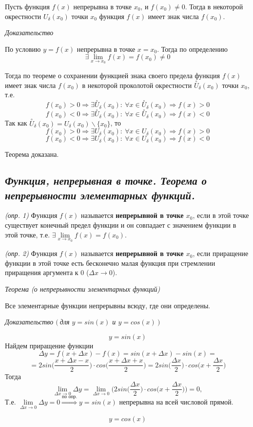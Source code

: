 Пусть функция $f(x)$ непрерывна в точке $x_0$, и $f(x_0) \neq 0$. Тогда в некоторой окрестности $U_\delta(x_0)$ точки $x_0$ функция $f(x)$ имеет знак числа $f(x_0)$.

\textit{Доказательство}

По условию $y = f(x)$ непрерывна в точке $x = x_0$. Тогда по определению $$\exists\lim\limits_{x \to x_0}f(x) = f(x_0) \neq 0$$

Тогда по теореме о сохранении функцией знака своего предела функция $f(x)$ имеет знак числа $f(x_0)$ в некоторой проколотой окрестности $\overset{\circ}U_\delta(x_0)$ точки $x_0$, т.е. $$f(x_0) > 0 \Rightarrow \exists \overset{\circ}U_\delta(x_0):\ \forall x \in \overset{\circ}U_\delta(x_0)\Rightarrow f(x) > 0 $$ $$f(x_0) < 0 \Rightarrow \exists \overset{\circ}U_\delta(x_0):\ \forall x \in \overset{\circ}U_\delta(x_0)\Rightarrow f(x) < 0 $$ Так как $\overset{\circ}U_\delta(x_0) = U_\delta(x_0) \backslash \{x_0\}$, то
$$f(x_0) > 0 \Rightarrow \exists U_\delta(x_0):\ \forall x \in U_\delta(x_0)\Rightarrow f(x) > 0 $$ $$f(x_0) < 0 \Rightarrow \exists U_\delta(x_0):\ \forall x \in U_\delta(x_0)\Rightarrow f(x) < 0 $$

Теорема доказана.
\newpage 
\subsection{\textit{Функция, непрерывная в точке. Теорема о непрерывности элементарных функций.}}

\textit{(опр. 1)} Функция $f(x)$ называется \textbf{непрерывной в точке $x_0$}, если в этой точке существует конечный предел функции и он совпадает с значением функции в этой точке, т.е. $\exists \lim\limits_{x \to x_0}f(x) = f(x_0)$.

\textit{(опр. 2)} Функция $f(x)$ называется \textbf{непрерывной в точке $x_0$}, если приращение функции в этой точке есть бесконечно малая функция при стремлении приращения аргумента к 0 ($\Delta x \rightarrow 0$).

\textit{Теорема (о непрерывности элементарных функций)}

Все элементарные функции непрерывны всюду, где они определены.

\textit{Доказательство $(\ $для $y = sin(x)$ и $y = cos( x)\ )$}
\begin{mainQuote}

$$y = sin(x)$$ Найдем приращение функции $$\Delta y = f(x + \Delta x) - f(x) = sin(x + \Delta x) - sin(x) =$$ $$= 2sin{\Big(}\frac{x + \Delta x - x}{2}{\Big)}\cdot cos\Big(\frac{x + \Delta x + x}{2}{\Big)} = 2sin{\Big(}\frac{\Delta x}{2}{\Big)}\cdot cos\Big(x + \frac{ \Delta x }{2}{\Big)}$$ Тогда $$\lim\limits_{\Delta x \to 0}\Delta y = \lim\limits_{\Delta x \to 0}\Bigg(2sin{\Big(}\frac{\Delta x}{2}{\Big)}\cdot cos\Big(x + \frac{ \Delta x }{2}{\Big)}\Bigg) = 0, $$ Т.е. $\lim\limits_{\Delta x \to 0}\Delta y = 0 \overset{\text{по опр.}}\Rightarrow y = sin(x)$ непрерывна на всей числовой прямой.
\end{mainQuote}
\begin{mainQuote}

$$y = cos(x)$$
\end{mainQuote}

